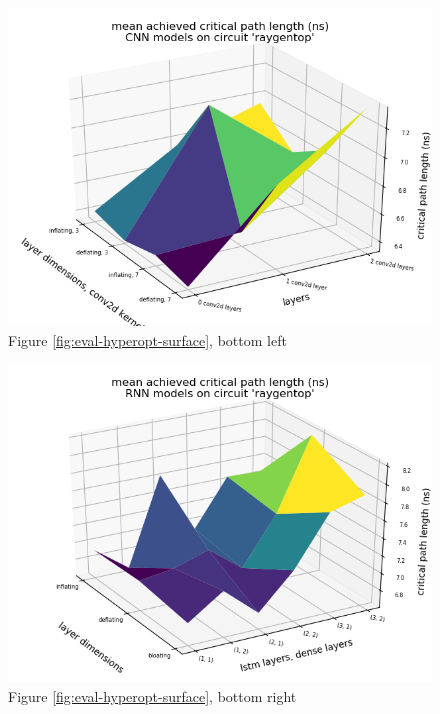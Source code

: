 \begin{figure}[H]
\includegraphics[width=\linewidth]{plots/cnn-hyperopt-critical-path.png}
\caption{Figure \ref{fig:eval-hyperopt-surface}, bottom left}
\end{figure}

\begin{figure}[H]
\includegraphics[width=\linewidth]{plots/rnn-hyperopt-critical-path.png}
\caption{Figure \ref{fig:eval-hyperopt-surface}, bottom right}
\end{figure}

